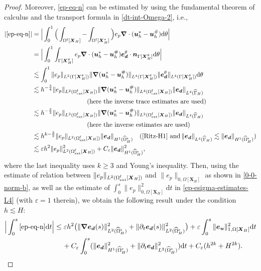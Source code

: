 \documentclass[11pt,reqno]{amsart}
\theoremstyle{definition}
\theoremstyle{plain}
\numberwithin{theorem}{section}
\numberwithin{proposition}{section}
\numberwithin{lemma}{section}
\numberwithin{equation}{section}
\newcommand{\bs}[1]{\boldsymbol{#1}}
\newcommand{\uu}[1]  {{\bs{#1}} }
\newcommand{\dep}{{{\bs{d}}}}
\newcommand{\grad}   { \uu{\nabla}    }
\def\d{\mathrm{d}}
\renewcommand{\(}{\bigl(}
\renewcommand{\)}{\bigr)}
\begin{document}
\begin{proof}
Moreover, \eqref{ep-eq-n} can be estimated by using the fundamental theorem of calculus and the transport formula in \eqref{dt-int-Omega-2}, i.e., 
\begin{align}\label{requive-kgeq3}
|\eqref{ep-eq-n}|
&= \Big| \int_0^1 \Big( \int_{\Omega^{\rm f}[\bs X_H]} - \int_{\Omega^{\rm f}[\bs X_H^*]} \Big) e_p \grad\cdot({\bs u}_h^*-{\bs u}_h^\#) \d\theta \Big| \notag\\
&= \Big| \int_0^1 \int_{\Gamma[\bs X_H^\theta]} e_p \grad\cdot({\bs u}_h^*-{\bs u}_h^\#) {\bs e}_{\bs d}^\theta\cdot{\bs n}_{\Gamma[\bs X_H^\theta]} \d\theta \Big| \notag\\
&\lesssim \int_0^1 \|e_p\|_{L^2(\Gamma[\bs X_H^\theta])} \|\grad({\bs u}_h^*-{\bs u}_h^\#) \|_{L^4(\Gamma[\bs X_H^\theta])} \|{\bs e}_{\bs d}^\theta\|_{L^4(\Gamma[\bs X_H^\theta])} \d\theta \notag\\
&\lesssim h^{-\frac34}\|e_p\|_{L^2(\Omega^{\rm f}_{\rm ext}[{\bs X}_H])} \|\grad({\bs u}_h^*-{\bs u}_h^\#) \|_{L^4(\Omega^{\rm f}_{\rm ext}[{\bs X}_H])} \|{\bs e}_{\bs d}\|_{L^4(\widehat\Gamma_H)} \notag\\
&\hspace{85pt}\mbox{(here the inverse trace estimates are used)} \notag\\
&\lesssim h^{-\frac32}\|e_p\|_{L^2(\Omega^{\rm f}_{\rm ext}[{\bs X}_H])} \|\grad({\bs u}_h^*-{\bs u}_h^\#) \|_{L^2(\Omega^{\rm f}_{\rm ext}[{\bs X}_H])} \|{\bs e}_{\bs d}\|_{L^4(\widehat\Gamma_H)} \notag\\
&\hspace{85pt}\mbox{(here the inverse estimates are used)} \notag\\
&\lesssim h^{k-\frac32}\|e_p\|_{L^2(\Omega^{\rm f}_{\rm ext}[{\bs X}_H])} \|{\bs e}_{\bs d}\|_{H^1(\widehat\Omega^{\rm s}_H)} 
\quad\mbox{(\eqref{Ritz-H1} and}\, \|{\bs e}_{\bs d}\|_{L^4(\widehat\Gamma_H)}\lesssim \|{\bs e}_{\bs d}\|_{H^1(\widehat\Omega^{\rm s}_H)}) \notag\\
&\lesssim \varepsilon h^2 \|e_p\|_{L^2(\Omega^{\rm f}_{\rm ext}[{\bs X}_H])}^2 + C_\varepsilon \|{\bs e}_{\bs d}\|_{H^1(\widehat\Omega^{\rm s}_H)}^2 ,
\end{align}
where the last inequality uses $k\ge 3$ and Young's inequality. Then, using the estimate of relation between $\|e_p\|_{L^2(\Omega^{\rm f}_{\rm ext}[{\bs X}_H])}$ and $\| e_p \|_{0,\Omega[{\bs X}_H]}$ as shown in \eqref{0-0-norm-b}, as well as the estimate of $\int_0^s \| e_p \|_{0,\Omega[{\bs X}_H]}^2 \d t$ in \eqref{ep-esigma-estimates-L4} (with $\varepsilon=1$ therein), we obtain the following result under the condition $h\lesssim H$: 
\begin{align} 
\Big| \int_0^s \eqref{ep-eq-n} \d t \Big| 
&
\le 
\varepsilon h^2
\big( \|\grad{\bs e}_{\bs d}(s)\|_{L^2(\widehat\Omega^{\rm s}_H)}^2 + \|\partial_t{\bs e}_{\bs d}(s)\|_{L^2(\widehat\Omega^{\rm s}_H)}^2 \big)
+ \varepsilon \int_0^s \| {\bs e}_{\bs u}  \|_{1,\Omega[{\bs X}_H]}^2  \d t \notag\\
&\quad\, 
+ C_\varepsilon  \int_0^s (\|{\bs e}_\dep\|_{H^1(\widehat{\Omega}^{\rm s}_H)}^2 + \|\partial_t{\bs e}_\dep\|_{L^2(\widehat{\Omega}^{\rm s}_H)}^2) \d t 
+ C_\varepsilon  (h^{2k} + H^{2k} ) . 
\end{align}


\end{proof}
\end{document}
